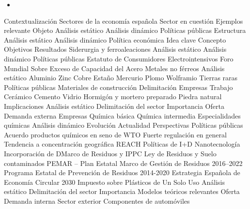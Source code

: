 \documentclass{nuevotema}
\begin{document}
\ideaclave




\begin{itemize}
	\item 
\end{itemize}

\esquemacorto

\begin{esquema}[enumerate]
	\1[] 
		\2 Contextualización
			\3 Sectores de la economía española
			\3 Sector en cuestión
			\3 Ejemplos relevante
		\2 Objeto
			\3 Análisis estático
			\3 Análisis dinámico
			\3 Políticas públicas
		\2 Estructura
			\3 Análisis estático
			\3 Análisis dinámico
			\3 Política económica
	\1 
		\2 Idea clave
			\3 Concepto
			\3 Objetivos
			\3 Resultados
		\2 Siderurgia y ferroaleaciones
			\3 Análisis estático
			\3 Análisis dinámico
			\3 Políticas públicas
			\3 Estatuto de Consumidores Electrointensivos
			\3 Foro Mundial Sobre Exceso de Capacidad del Acero
		\2 Metales no férreos
			\3 Análisis estático
			\3 Aluminio
			\3 Zinc
			\3 Cobre
			\3 Estaño
			\3 Mercurio
			\3 Plomo
			\3 Wolframio
			\3 Tierras raras
			\3 Políticas públicas
		\2 Materiales de construcción
			\3 Delimitación
			\3 Empresas
			\3 Trabajo
			\3 Cerámico
			\3 Cemento
			\3 Vidrio
			\3 Hormigón y mortero preparado
			\3 Piedra natural
			\3 Implicaciones
	\1 
		\2 Análisis estático
			\3 Delimitación del sector
			\3 Importancia
			\3 Oferta
			\3 Demanda externa
			\3 Empresas
			\3 Química básica
			\3 Química intermedia
			\3 Especialidades químicas
		\2 Análisis dinámico
			\3 Evolución
			\3 Actualidad
			\3 Perspectivas
		\2 Políticas públicas
			\3 Acuerdo productos químicos en seno de WTO
			\3 Fuerte regulación en general
			\3 Tendencia a concentración geográfica
			\3 REACH
			\3 Políticas de I+D
			\3 Nanotecnología
			\3 Incorporación de DMarco de Residuos y IPPC
			\3 Ley de Residuos y Suelo contaminados
			\3 PEMAR -- Plan Estatal Marco de Gestión de Residuos 2016--2022
			\3 Programa Estatal de Prevención de Residuos 2014-2020
			\3 Estrategia Española de Economía Circular 2030
			\3 Impuesto sobre Plásticos de Un Solo Uso
	\1 
		\2 Análisis estático
			\3 Delimitación del sector
			\3 Importancia
			\3 Modelos teóricos relevantes
			\3 Oferta
			\3 Demanda interna
			\3 Sector exterior
		\2 Componentes de automóviles

\end{esquema}
\end{document}
